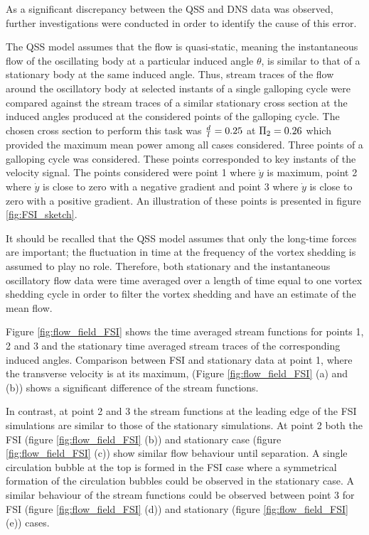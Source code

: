 As a significant discrepancy between the QSS and DNS data was observed, further investigations were conducted in order to identify the cause of this error. 

The QSS model assumes that the flow is quasi-static, meaning the instantaneous flow of the oscillating body at a particular induced angle $\theta$, is similar to that of a stationary body at the same induced angle. Thus, stream traces of the flow around the oscillatory body at selected instants of a single galloping cycle were compared against the stream traces of a similar stationary cross section at the induced angles produced at the considered points of the galloping cycle. The chosen cross section to perform this task was $\frac{d}{l}=0.25$ at $\Pi_2=0.26$ which provided the maximum mean power among all cases considered. Three points of a galloping cycle was considered. These points corresponded to key instants of the velocity signal. The points considered  were point 1 where $\dot{y}$ is maximum, point 2 where $\dot{y}$ is close to zero with a negative gradient and point 3 where $\dot{y}$ is close to zero with a positive gradient. An illustration of these points is presented in figure \ref{fig:FSI_sketch}.

It should be recalled that the QSS model assumes that only the long-time forces are important; the fluctuation in time at the frequency of the vortex shedding is assumed to play no role. Therefore, both stationary and the instantaneous oscillatory flow data were time averaged over a length of time equal to one vortex shedding cycle in order to filter the vortex shedding and have an estimate of the mean flow.   




Figure \ref{fig:flow_field_FSI} shows the time averaged stream functions for points 1, 2 and 3 and the stationary time averaged stream traces of the corresponding induced angles. Comparison between FSI and stationary data at point 1, where the transverse velocity is at its maximum, (Figure \ref{fig:flow_field_FSI} (a) and (b)) shows a significant difference of the stream functions. 



In contrast, at point 2 and 3 the stream functions at the leading edge of the FSI simulations are similar to those of the stationary simulations. At point 2 both the FSI (figure \ref{fig:flow_field_FSI} (b)) and stationary  case (figure \ref{fig:flow_field_FSI} (c)) show similar flow behaviour until separation. A single circulation bubble at the top is formed in the FSI case where a symmetrical formation of the circulation bubbles could be observed in the stationary case. A similar behaviour of the stream functions could be observed between point 3 for FSI (figure \ref{fig:flow_field_FSI} (d)) and stationary (figure \ref{fig:flow_field_FSI} (e)) cases. 

